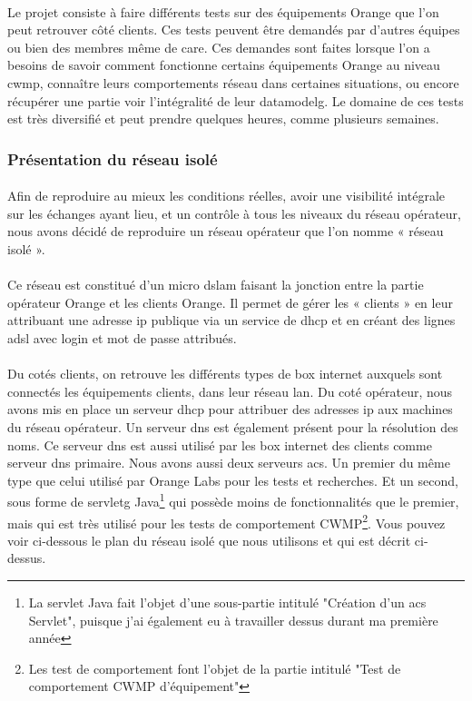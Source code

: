 \documentclass[12pt,a4paper]{report}
\begin{document}
\paragraph*{}Le projet consiste à faire différents tests sur des équipements Orange que l’on peut retrouver côté clients. Ces tests peuvent être demandés par d'autres équipes ou bien des membres même de \gls{care}. Ces demandes sont faites lorsque l'on a besoins de savoir comment fonctionne certains équipements Orange au niveau \gls{cwmp}, connaître leurs comportements réseau dans certaines situations, ou encore récupérer une partie voir l'intégralité de leur \gls{datamodelg}. Le domaine de ces tests est très diversifié et peut prendre quelques heures, comme plusieurs semaines. \\
\subsubsection{Présentation du réseau isolé}
\paragraph*{}Afin de reproduire au mieux les conditions réelles, avoir une visibilité intégrale sur les échanges ayant lieu, et un contrôle à tous les niveaux du réseau opérateur, nous avons décidé de reproduire un réseau opérateur que l’on nomme « réseau isolé ». 
\paragraph*{}Ce réseau est constitué d’un micro \gls{dslam} faisant la jonction entre la partie opérateur Orange et les clients Orange. Il permet de gérer les « clients » en leur attribuant une adresse \gls{ip} publique via un service de \gls{dhcp} et en créant des lignes \gls{adsl} avec login et mot de passe attribués. 
\paragraph*{}Du cotés clients, on retrouve les différents types de box internet auxquels sont connectés les équipements clients, dans leur réseau \gls{lan}. 
Du coté opérateur, nous avons mis en place un serveur \gls{dhcp} pour attribuer des adresses \gls{ip} aux machines du réseau opérateur. Un serveur \gls{dns} est également présent pour la résolution des noms. Ce serveur \gls{dns} est aussi utilisé par les box internet des clients comme serveur \gls{dns} primaire. Nous avons aussi deux serveurs \gls{acs}. Un premier du même type que celui utilisé par Orange Labs pour les tests et recherches. Et un second, sous forme de \gls{servletg} Java\footnote{La servlet Java fait l'objet d'une sous-partie intitulé "Création d'un \gls{acs} Servlet", puisque j'ai également eu à travailler dessus durant ma première année} qui possède moins de fonctionnalités que le premier, mais qui est très utilisé pour les tests de comportement CWMP\footnote{Les test de comportement font l'objet de la partie intitulé "Test de comportement CWMP d'équipement"}. Vous pouvez voir ci-dessous le plan du réseau isolé que nous utilisons et qui est décrit ci-dessus.
\end{document}
